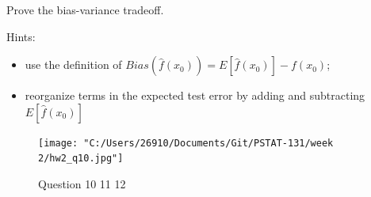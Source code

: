 \documentclass[
]{article}
\providecommand{\tightlist}{%
  \setlength{\itemsep}{0pt}\setlength{\parskip}{0pt}}
\begin{document}
Prove the bias-variance tradeoff.

Hints:

\begin{itemize}
\tightlist
\item
  use the definition of \(Bias(\hat{f}(x_0))=E[\hat{f}(x_0)]-f(x_0)\);
\item
  reorganize terms in the expected test error by adding and subtracting
  \(E[\hat{f}(x_0)]\)
\end{itemize}

\begin{figure}
\centering
\texttt{[image: "C:/Users/26910/Documents/Git/PSTAT-131/week 2/hw2\_q10.jpg"]}
\caption{Question 10 11 12}
\end{figure}
\end{document}
